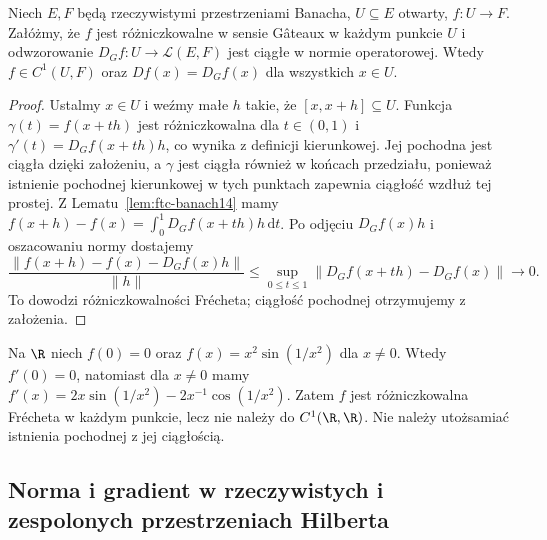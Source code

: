\begin{twierdzenie}
\label{thm:continuous-gateaux14}
Niech $E,F$ będą rzeczywistymi przestrzeniami Banacha, $U\subseteq E$ otwarty, $f:U\to F$. Załóżmy, że $f$ jest różniczkowalne w sensie Gâteaux w każdym punkcie $U$ i odwzorowanie $D_Gf:U\to\mathcal L(E,F)$ jest ciągłe w normie operatorowej. Wtedy $f\in C^1(U,F)$ oraz $Df(x)=D_Gf(x)$ dla wszystkich $x\in U$.
\end{twierdzenie}
\begin{proof}
Ustalmy $x\in U$ i weźmy małe $h$ takie, że $[x,x+h]\subseteq U$. Funkcja $\gamma(t)=f(x+th)$ jest różniczkowalna dla $t\in(0,1)$ i $\gamma'(t)=D_Gf(x+th)h$, co wynika z definicji kierunkowej. Jej pochodna jest ciągła dzięki założeniu, a $\gamma$ jest ciągła również w końcach przedziału, ponieważ istnienie pochodnej kierunkowej w tych punktach zapewnia ciągłość wzdłuż tej prostej. Z Lematu~\ref{lem:ftc-banach14} mamy
$f(x+h)-f(x)=\int_0^1 D_Gf(x+th)h\,\mathrm dt$.
Po odjęciu $D_Gf(x)h$ i oszacowaniu normy dostajemy
\[
\frac{\|f(x+h)-f(x)-D_Gf(x)h\|}{\|h\|}
\le\sup_{0\le t\le1}\|D_Gf(x+th)-D_Gf(x)\|\longrightarrow0.
\]
To dowodzi różniczkowalności Frécheta; ciągłość pochodnej otrzymujemy z założenia.
\end{proof}

\begin{przyklad}
\label{ex:derivative-noncontinuous14}
Na $\R$ niech $f(0)=0$ oraz $f(x)=x^2\sin(1/x^2)$ dla $x\ne0$. Wtedy $f'(0)=0$, natomiast dla $x\ne0$ mamy $f'(x)=2x\sin(1/x^2)-2x^{-1}\cos(1/x^2)$. Zatem $f$ jest różniczkowalna Frécheta w każdym punkcie, lecz nie należy do $C^1(\R,\R)$. Nie należy utożsamiać istnienia pochodnej z jej ciągłością.
\end{przyklad}

\subsection{Norma i gradient w rzeczywistych i zespolonych przestrzeniach Hilberta}

